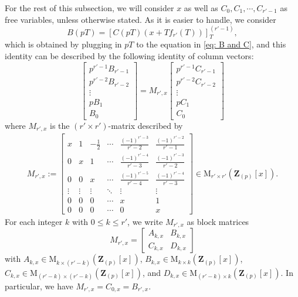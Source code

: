 \documentclass[11pt]{amsart}
\theoremstyle{definition}
\numberwithin{equation}{subsection}
\theoremstyle{plain}
\theoremstyle{plain}
\theoremstyle{plain}
\theoremstyle{plain}
\theoremstyle{plain}
\theoremstyle{plain}
\theoremstyle{plain}
\theoremstyle{plain}
\theoremstyle{plain}
\theoremstyle{plain}
\theoremstyle{plain}
\theoremstyle{plain}
\theoremstyle{definition}
\theoremstyle{definition}
\theoremstyle{definition}
\theoremstyle{remark}
\renewcommand{\(}{\textup{(}}
\renewcommand{\)}{\textup{)}}
\newcommand{\M}{\mathrm{M}}
\newcommand{\Z}{\mathbf{Z}}
\begin{document}
For the rest of this subsection, we will consider $x$ as well as $C_0,C_1,\cdots,C_{r'-1}$ as free variables, unless otherwise stated. As it is easier to handle, we consider $$B(pT)=[C(pT)(x+Tf_{r'}(T))]_{T}^{(r'-1)},$$ which is obtained by plugging in $pT$ to the equation in \eqref{eq: B and C}, and this identity can be described by the following identity of column vectors:
\begin{equation}\label{eq: B and C explicit}
        \begin{bmatrix}
       p^{r'-1} B_{r'-1}\\
       p^{r'-2} B_{r'-2}\\
        \vdots\\
        pB_1\\
        B_0
    \end{bmatrix}
    =
    M_{r',x}
    \begin{bmatrix}
        p^{r'-1} C_{r'-1}\\
        p^{r'-2} C_{r'-2}\\
        \vdots\\
        pC_1\\
        C_0
    \end{bmatrix}
\end{equation}
where $M_{r',x}$ is the $(r'\times r')$-matrix described by
\begin{align*}
    M_{r',x}
    :=\begin{bmatrix}
        x & 1 & -\frac{1}{2} & \cdots & \frac{(-1)^{r'-3}}{r'-2} & \frac{(-1)^{r'-2}}{r'-1}\\
        0 & x & 1 &  \cdots & \frac{(-1)^{r'-4}}{r'-3} & \frac{(-1)^{r'-3}}{r'-2}\\
        0 & 0 & x & \cdots & \frac{(-1)^{r'-5}}{r'-4} & \frac{(-1)^{r'-4}}{r'-3}\\
        \vdots & \vdots & \vdots & \ddots & \vdots & \vdots \\
        0 & 0 & 0 & \cdots & x & 1 \\
        0 & 0 & 0 & \cdots & 0 & x
    \end{bmatrix}
    \in \M_{r'\times r'}(\Z_{(p)}[x]).
\end{align*}
For each integer $k$ with $0\leq k\leq r'$, we write $M_{r',x}$ as block matrices
$$M_{r',x}=
\begin{bmatrix}
A_{k,x} & B_{k,x}\\
C_{k,x} & D_{k,x}
\end{bmatrix}
$$
with $A_{k,x}\in\M_{k\times(r'-k)}(\Z_{(p)}[x])$, $B_{k,x}\in\M_{k\times k}(\Z_{(p)}[x])$, $C_{k,x}\in\M_{(r'-k)\times (r'-k)}(\Z_{(p)}[x])$, and $D_{k,x}\in\M_{(r'-k)\times k}(\Z_{(p)}[x])$. In particular, we have $M_{r',x}=C_{0,x}=B_{r',x}$.
\end{document}
